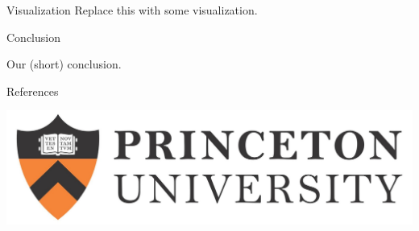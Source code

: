 \documentclass[final]{beamer}
\newlength{\onecolwid}
\begin{document}
\begin{frame}[t]
\begin{columns}[t]
\begin{column}{\onecolwid}
\begin{block}{Visualization}
Replace this with some visualization.

\end{block}


\begin{block}{Conclusion}

Our (short) conclusion.

\end{block}



\begin{block}{References}
\small



\end{block}

\begin{center}
\includegraphics[width=0.5\linewidth]{PU-long.jpg}
\end{center}


\end{column} %

\end{columns} %

\end{frame} %
\end{document}
